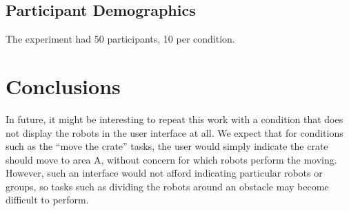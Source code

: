 \documentclass[]{article}
\begin{document}
\subsection{Participant Demographics}

The experiment had 50 participants, 10 per condition. 

\section{Conclusions}

In future, it might be interesting to repeat this work with a condition that does not display the robots in the user interface at all. 
We expect that for conditions such as the ``move the crate'' tasks, the user would simply indicate the crate should move to area A, without concern for which robots perform the moving. 
However, such an interface would not afford indicating particular robots or groups, so tasks such as dividing the robots around an obstacle may become difficult to perform. 



\end{document}

